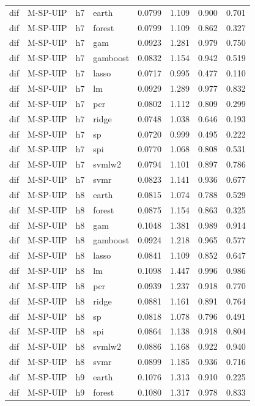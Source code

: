 \begin{ThreePartTable}
\begin{longtable}[t]{llclcccc}
dif & M-SP-UIP & h7 & earth & 0.0799 & 1.109 & 0.900 & 0.701\\
dif & M-SP-UIP & h7 & forest & 0.0799 & 1.109 & 0.862 & 0.327\\
dif & M-SP-UIP & h7 & gam & 0.0923 & 1.281 & 0.979 & 0.750\\
dif & M-SP-UIP & h7 & gamboost & 0.0832 & 1.154 & 0.942 & 0.519\\
dif & M-SP-UIP & h7 & lasso & 0.0717 & 0.995 & 0.477 & 0.110\\
dif & M-SP-UIP & h7 & lm & 0.0929 & 1.289 & 0.977 & 0.832\\
dif & M-SP-UIP & h7 & pcr & 0.0802 & 1.112 & 0.809 & 0.299\\
dif & M-SP-UIP & h7 & ridge & 0.0748 & 1.038 & 0.646 & 0.193\\
dif & M-SP-UIP & h7 & sp & 0.0720 & 0.999 & 0.495 & 0.222\\
dif & M-SP-UIP & h7 & spi & 0.0770 & 1.068 & 0.808 & 0.531\\
dif & M-SP-UIP & h7 & svmlw2 & 0.0794 & 1.101 & 0.897 & 0.786\\
dif & M-SP-UIP & h7 & svmr & 0.0823 & 1.141 & 0.936 & 0.677\\
\addlinespace
dif & M-SP-UIP & h8 & earth & 0.0815 & 1.074 & 0.788 & 0.529\\
dif & M-SP-UIP & h8 & forest & 0.0875 & 1.154 & 0.863 & 0.325\\
dif & M-SP-UIP & h8 & gam & 0.1048 & 1.381 & 0.989 & 0.914\\
dif & M-SP-UIP & h8 & gamboost & 0.0924 & 1.218 & 0.965 & 0.577\\
dif & M-SP-UIP & h8 & lasso & 0.0841 & 1.109 & 0.852 & 0.647\\
dif & M-SP-UIP & h8 & lm & 0.1098 & 1.447 & 0.996 & 0.986\\
dif & M-SP-UIP & h8 & pcr & 0.0939 & 1.237 & 0.918 & 0.770\\
dif & M-SP-UIP & h8 & ridge & 0.0881 & 1.161 & 0.891 & 0.764\\
dif & M-SP-UIP & h8 & sp & 0.0818 & 1.078 & 0.796 & 0.491\\
dif & M-SP-UIP & h8 & spi & 0.0864 & 1.138 & 0.918 & 0.804\\
dif & M-SP-UIP & h8 & svmlw2 & 0.0886 & 1.168 & 0.922 & 0.940\\
dif & M-SP-UIP & h8 & svmr & 0.0899 & 1.185 & 0.936 & 0.716\\
\addlinespace
dif & M-SP-UIP & h9 & earth & 0.1076 & 1.313 & 0.910 & 0.225\\
dif & M-SP-UIP & h9 & forest & 0.1080 & 1.317 & 0.978 & 0.833\\

\end{longtable}
\end{ThreePartTable}
